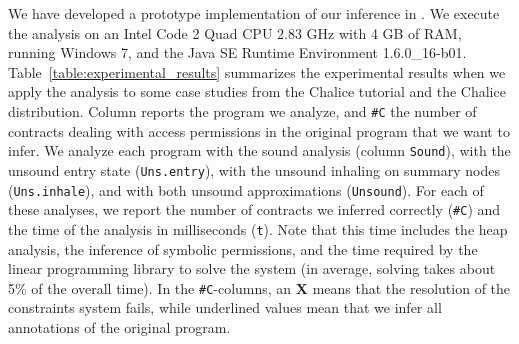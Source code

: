 \documentclass{llncs}
\begin{document}
We have developed a prototype implementation of our inference in
\Sample. We execute the analysis on an Intel Code 2 Quad CPU 2.83 GHz
with 4 GB of RAM, running Windows 7, and the Java SE Runtime
Environment 1.6.0\_16-b01. Table~\ref{table:experimental_results}
summarizes the experimental results when we apply the analysis to some
case studies from the Chalice tutorial \cite{LMS09} and the Chalice
distribution. Column  reports the program we
analyze, and \texttt{\#C} the number of contracts dealing with access
permissions in the original program that we want to infer. We analyze
each program with the sound analysis (column \texttt{Sound}), with the
unsound entry state (\texttt{Uns.entry}), with the unsound inhaling on
summary nodes (\texttt{Uns.inhale}), and with both unsound
approximations (\texttt{Unsound}). For each of these analyses, we
report the number of contracts we inferred correctly  (\texttt{\#C}) and
the time of the analysis in milliseconds (\texttt{t}). Note that this
time includes the heap analysis, the inference of symbolic permissions, and
the time required by the linear programming library to solve the
system (in average, solving takes about 5\% of the overall time). In
the \texttt{\#C}-columns, an \textbf{X} means that the resolution of the
constraints system fails, while underlined values mean that we infer
all annotations of the original program.
\end{document}
